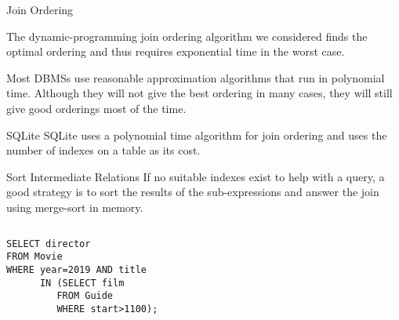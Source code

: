 \begin{frame}{Join Ordering}

The dynamic-programming join ordering algorithm we considered finds the optimal ordering and thus requires exponential time in the worst case.

Most DBMSs use reasonable approximation algorithms that run in polynomial time. Although they will not give the best ordering in many cases, they will still give good orderings most of the time.

\begin{block}{SQLite}
SQLite uses a polynomial time algorithm for join ordering and uses the number of indexes on a table as its cost.
\end{block}

\end{frame}

\begin{frame}[fragile]{Sort Intermediate Relations}
If no suitable indexes exist to help with a query, a good strategy is to sort the results of the sub-expressions and answer the join using merge-sort in memory.

\begin{columns}[onlytextwidth]
\begin{column}{0.4\textwidth}
\begin{lstlisting}[style=SQL]
SELECT director
FROM Movie
WHERE year=2019 AND title 
      IN (SELECT film
         FROM Guide
         WHERE start>1100);
\end{lstlisting}
\end{column}
\begin{column}{0.4\textwidth}
\end{column}
\end{columns}
\end{frame}

  